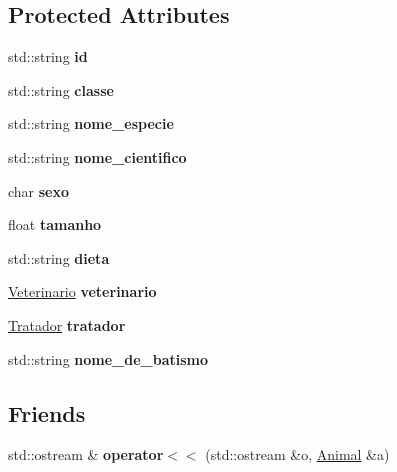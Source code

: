\subsection*{Protected Attributes}
\begin{DoxyCompactItemize}
\item 
\mbox{\label{classAnimal_a680dc3aa9dfaa9a9fa3abd564ec91a9f}} 
std\+::string {\bfseries id}
\item 
\mbox{\label{classAnimal_aa5a6a3e322de28da865a7e2a91b9416d}} 
std\+::string {\bfseries classe}
\item 
\mbox{\label{classAnimal_abc4601e5206852c0bb757e73e461eda2}} 
std\+::string {\bfseries nome\+\_\+especie}
\item 
\mbox{\label{classAnimal_a5a5861cf1a9abf2c9e26342f07cf4de5}} 
std\+::string {\bfseries nome\+\_\+cientifico}
\item 
\mbox{\label{classAnimal_a1fed4a4c287d4a9507e718692eb2837a}} 
char {\bfseries sexo}
\item 
\mbox{\label{classAnimal_af164439fb6b2f4c470f451a8e7cbfd1e}} 
float {\bfseries tamanho}
\item 
\mbox{\label{classAnimal_a253b474ae6bc13d122d07ff22d6aabc5}} 
std\+::string {\bfseries dieta}
\item 
\mbox{\label{classAnimal_a3618cd50da896cee0b62eec659d2c2bb}} 
\hyperlink{classVeterinario}{Veterinario} {\bfseries veterinario}
\item 
\mbox{\label{classAnimal_a9a864369990c6743895032c6c8f2bdbc}} 
\hyperlink{classTratador}{Tratador} {\bfseries tratador}
\item 
\mbox{\label{classAnimal_a49467456bdef4eee33c271fa702c5f02}} 
std\+::string {\bfseries nome\+\_\+de\+\_\+batismo}
\end{DoxyCompactItemize}
\subsection*{Friends}
\begin{DoxyCompactItemize}
\item 
\mbox{\label{classAnimal_a60e87f6bdfb739354180c27be7186c0a}} 
std\+::ostream \& {\bfseries operator$<$$<$} (std\+::ostream \&o, \hyperlink{classAnimal}{Animal} \&a)
\end{DoxyCompactItemize}


